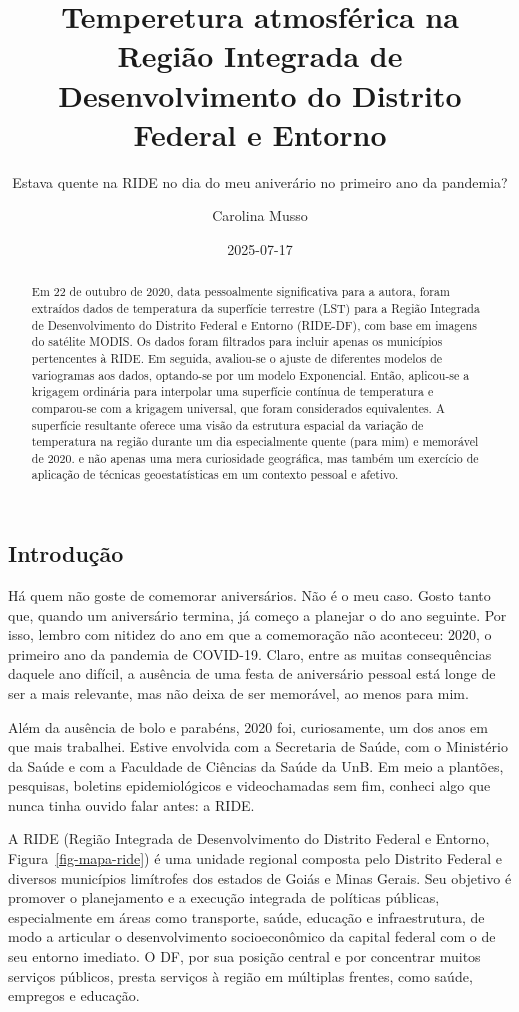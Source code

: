 \documentclass[
  letterpaper,
  DIV=11,
  numbers=noendperiod]{scrartcl}
\title{Temperetura atmosférica na Região Integrada de Desenvolvimento do
Distrito Federal e Entorno}
\subtitle{Estava quente na RIDE no dia do meu aniverário no primeiro ano
da pandemia?}
\author{Carolina Musso}
\date{2025-07-17}
\begin{document}
\maketitle
\begin{abstract}
Em 22 de outubro de 2020, data pessoalmente significativa para a autora,
foram extraídos dados de temperatura da superfície terrestre (LST) para
a Região Integrada de Desenvolvimento do Distrito Federal e Entorno
(RIDE-DF), com base em imagens do satélite MODIS. Os dados foram
filtrados para incluir apenas os municípios pertencentes à RIDE. Em
seguida, avaliou-se o ajuste de diferentes modelos de variogramas aos
dados, optando-se por um modelo Exponencial. Então, aplicou-se a
krigagem ordinária para interpolar uma superfície contínua de
temperatura e comparou-se com a krigagem universal, que foram
considerados equivalentes. A superfície resultante oferece uma visão da
estrutura espacial da variação de temperatura na região durante um dia
especialmente quente (para mim) e memorável de 2020. e não apenas uma
mera curiosidade geográfica, mas também um exercício de aplicação de
técnicas geoestatísticas em um contexto pessoal e afetivo.
\end{abstract}
\subsection{Introdução}\label{introduuxe7uxe3o}

Há quem não goste de comemorar aniversários. Não é o meu caso. Gosto
tanto que, quando um aniversário termina, já começo a planejar o do ano
seguinte. Por isso, lembro com nitidez do ano em que a comemoração não
aconteceu: 2020, o primeiro ano da pandemia de COVID-19. Claro, entre as
muitas consequências daquele ano difícil, a ausência de uma festa de
aniversário pessoal está longe de ser a mais relevante, mas não deixa de
ser memorável, ao menos para mim.

Além da ausência de bolo e parabéns, 2020 foi, curiosamente, um dos anos
em que mais trabalhei. Estive envolvida com a Secretaria de Saúde, com o
Ministério da Saúde e com a Faculdade de Ciências da Saúde da UnB. Em
meio a plantões, pesquisas, boletins epidemiológicos e videochamadas sem
fim, conheci algo que nunca tinha ouvido falar antes: a RIDE.

A RIDE (Região Integrada de Desenvolvimento do Distrito Federal e
Entorno, Figura~\ref{fig-mapa-ride}) é uma unidade regional composta
pelo Distrito Federal e diversos municípios limítrofes dos estados de
Goiás e Minas Gerais. Seu objetivo é promover o planejamento e a
execução integrada de políticas públicas, especialmente em áreas como
transporte, saúde, educação e infraestrutura, de modo a articular o
desenvolvimento socioeconômico da capital federal com o de seu entorno
imediato. O DF, por sua posição central e por concentrar muitos serviços
públicos, presta serviços à região em múltiplas frentes, como saúde,
empregos e educação.
\end{document}
